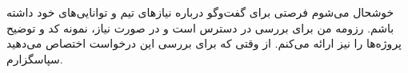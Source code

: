 خوشحال می‌شوم فرصتی برای گفت‌وگو درباره نیازهای تیم و توانایی‌های خود داشته باشم. رزومه من برای بررسی در دسترس است و در صورت نیاز، نمونه کد و توضیح پروژه‌ها را نیز ارائه می‌کنم. از وقتی که برای بررسی این درخواست اختصاص می‌دهید سپاسگزارم.

